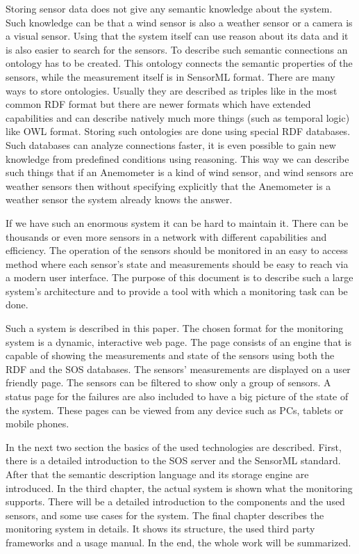 Storing sensor data does not give any semantic knowledge about the system. Such knowledge can be that a wind sensor is also a weather sensor or a camera is a visual sensor. Using that the system itself can use reason about its data and it is also easier to search for the sensors. To describe such semantic connections an ontology has to be created.
This ontology connects the semantic properties of the sensors, while the measurement itself is in SensorML format.
There are many ways to store ontologies. Usually they are described as triples like in the most common RDF format but there are newer formats which have extended capabilities and can describe natively much more things (such as temporal logic) like OWL format. Storing such ontologies are done using special RDF databases. Such databases can analyze connections faster, it is even possible to gain new knowledge from predefined conditions using reasoning. This way we can describe such things that if an Anemometer is a kind of wind sensor, and wind sensors are weather sensors then without specifying explicitly that the Anemometer is a weather sensor the system already knows the answer. 

If we have such an enormous system it can be hard to maintain it. There can be thousands or even more sensors in a network with different capabilities and efficiency. The operation of the sensors should be monitored in an easy to access method where each sensor's state and measurements should be easy to reach via a modern user interface. The purpose of this document is to describe such a large system's architecture and to provide a tool with which a monitoring task can be done.

Such a system is described in this paper. The chosen format for the monitoring system is a dynamic, interactive web page. The page consists of an engine that is capable of showing the measurements and state of the sensors using both the RDF and the SOS databases. The sensors' measurements are displayed on a user friendly page. The sensors can be filtered to show only a group of sensors. A status page for the failures are also included to have a big picture of the state of the system. These pages can be viewed from any device such as PCs, tablets or mobile phones.

In the next two section the basics of the used technologies are described. First, there is a detailed introduction to the SOS server and the SensorML standard. After that the semantic description language and its storage engine are introduced. 
In the third chapter, the actual system is shown what the monitoring supports. 
There will be a detailed introduction to the components and the used sensors, and some use cases for the system. The final chapter describes the monitoring system in details. It shows its structure, the used third party frameworks and a usage manual. In the end, the whole work will be summarized. 

